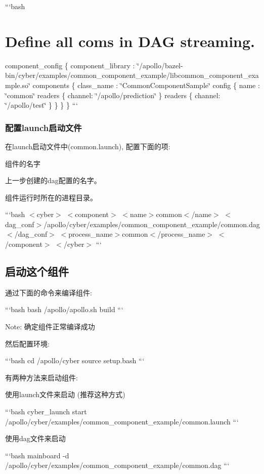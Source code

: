 ```bash \section*{Define all coms in D\-A\-G streaming.}

component\-\_\-config \{ component\-\_\-library \-: \char`\"{}/apollo/bazel-\/bin/cyber/examples/common\-\_\-component\-\_\-example/libcommon\-\_\-component\-\_\-example.\-so\char`\"{} components \{ class\-\_\-name \-: \char`\"{}\-Common\-Component\-Sample\char`\"{} config \{ name \-: \char`\"{}common\char`\"{} readers \{ channel\-: \char`\"{}/apollo/prediction\char`\"{} \} readers \{ channel\-: \char`\"{}/apollo/test\char`\"{} \} \} \} \} ```

\subsubsection*{配置launch启动文件}

在launch启动文件中(common.\-launch), 配置下面的项\-:


\begin{DoxyItemize}
\item 组件的名字
\item 上一步创建的dag配置的名字。
\item 组件运行时所在的进程目录。
\end{DoxyItemize}

```bash $<$cyber$>$ $<$component$>$ $<$name$>$common$<$/name$>$ $<$dag\-\_\-conf$>$/apollo/cyber/examples/common\-\_\-component\-\_\-example/common.dag$<$/dag\-\_\-conf$>$ $<$process\-\_\-name$>$common$<$/process\-\_\-name$>$ $<$/component$>$ $<$/cyber$>$ ```

\subsection*{启动这个组件}

通过下面的命令来编译组件\-:

```bash bash /apollo/apollo.sh build ```

Note\-: 确定组件正常编译成功

然后配置环境\-:

```bash cd /apollo/cyber source setup.\-bash ```

有两种方法来启动组件\-:


\begin{DoxyItemize}
\item 使用launch文件来启动 (推荐这种方式)
\end{DoxyItemize}

```bash cyber\-\_\-launch start /apollo/cyber/examples/common\-\_\-component\-\_\-example/common.launch ```


\begin{DoxyItemize}
\item 使用dag文件来启动
\end{DoxyItemize}

```bash mainboard -\/d /apollo/cyber/examples/common\-\_\-component\-\_\-example/common.dag ``` 